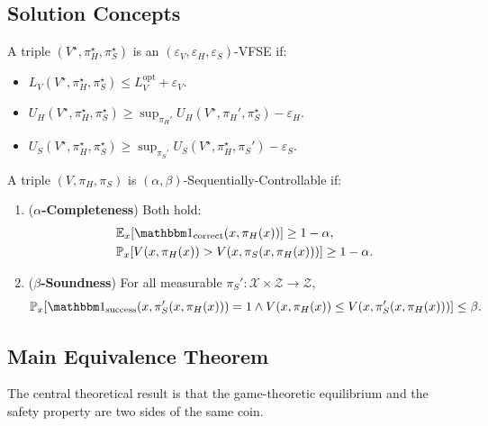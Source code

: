 \subsection{Solution Concepts}

\begin{definition}
A triple $(V^\star, \pi_H^\star, \pi_S^\star)$ is an $(\varepsilon_V, \varepsilon_H, \varepsilon_S)$-VFSE if:
\begin{itemize}
    \item[(V)] $L_V(V^\star, \pi_H^\star, \pi_S^\star) \le L_V^\mathrm{opt} + \varepsilon_V$.
    \item[(H)] $U_H(V^\star, \pi_H^\star, \pi_S^\star) \ge \sup_{\pi_H'} U_H(V^\star, \pi_H', \pi_S^\star) - \varepsilon_H$.
    \item[(S)] $U_S(V^\star, \pi_H^\star, \pi_S^\star) \ge \sup_{\pi_S'} U_S(V^\star, \pi_H^\star, \pi_S') - \varepsilon_S$.
\end{itemize}
\end{definition}

\begin{definition}
A triple $(V, \pi_H, \pi_S)$ is $(\alpha, \beta)$-Sequentially-Controllable if:
\begin{enumerate}
    \item (\textbf{$\alpha$-Completeness}) Both hold:
    \begin{align*}
        &\mathbb{E}_x[\corr(x, \pi_H(x))] \ge 1-\alpha, \\
        &\mathbb{P}_x[V(x, \pi_H(x)) > V(x, \pi_S(x, \pi_H(x)))] \ge 1-\alpha.
    \end{align*}
    \item (\textbf{$\beta$-Soundness}) For all measurable $\pi_S': \mathcal{X} \times \mathcal{Z} \to \mathcal{Z}$,
    \[ \mathbb{P}_x[\success(x, \pi_S'(x, \pi_H(x)))=1 \wedge V(x, \pi_H(x)) \le V(x, \pi_S'(x, \pi_H(x)))] \le \beta. \]
\end{enumerate}
\end{definition}


\subsection{Main Equivalence Theorem}
The central theoretical result is that the game-theoretic equilibrium and the safety property are two sides of the same coin.

